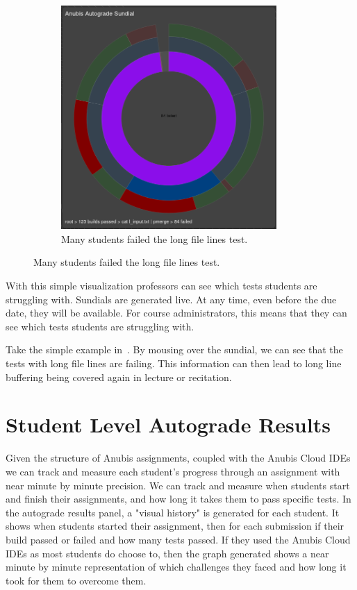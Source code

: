 \begin{figure}[ht]
\begin{subfigure}{0.5\textwidth}
        \includegraphics[width=0.9\textwidth]{figures/sundial-3}
        \caption{Many students failed the long file lines test.\label{fig:autograde-sundial-3} }
    \end{subfigure}
\end{figure}

With this simple visualization professors can see which tests students are struggling with.
Sundials are generated live.
At any time, even before the due date, they will be available.
For course administrators, this means that they can see which tests students are struggling with.


Take the simple example in~.
By mousing over the sundial, we can see that the tests with long file lines are failing.
This information can then lead to long line buffering being covered again in lecture or
recitation.

\section{Student Level Autograde Results}\label{sec:student-level-results}

Given the structure of Anubis assignments, coupled with the Anubis Cloud IDEs we can
track and measure each student's progress through an assignment with near minute by minute precision.
We can track and measure when students start and finish their assignments,
and how long it takes them to pass specific tests.
In the autograde results panel, a "visual history" is generated for each student.
It shows when students started their assignment, then for each submission if their
build passed or failed and how many tests passed.
If they used the Anubis Cloud IDEs as most students do choose to,
then the graph generated shows a near minute by minute representation of which
challenges they faced and how long it took for them to overcome them.

